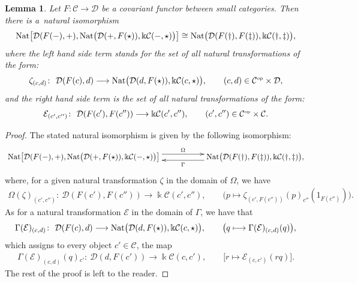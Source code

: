 \documentclass[pdftex]{sigma}
\numberwithin{equation}{section}
\newtheorem{Lemma}[Theorem]{Lemma}
\newcommand{\cD}{{\mathcal D}}
\newcommand{\cE}{{\mathcal E}}
\newcommand{\Sscript}[1]{\scriptscriptstyle{#1}}
\begin{document}
\begin{Lemma}\label{lema:I-II-2}Let $F\colon \mathcal{C} \to \cD$ be a covariant functor between small categories. Then there is a~natural isomorphism
\begin{gather*}
{\rm Nat}\big[ \cD(F(-),+), {\rm Nat} \big( \cD(+, F(\star)), \Bbbk \mathcal{C}(-,\star) \big) \big] \cong {\rm Nat}\big( \cD(F(\dag),F(\ddag)), \Bbbk \mathcal{C}(\dag,\ddag) \big),
\end{gather*}
where the left hand side term stands for the set of all natural transformations of the form:
\begin{gather*}
\zeta_{(c, d)}\colon \ \cD(F(c),d) \longrightarrow{\rm Nat} \big( \cD(d, F(\star)), \Bbbk \mathcal{C}(c,\star) \big), \qquad (c,d) \in \mathcal{C}^{\Sscript{\rm op}} \times \cD,
\end{gather*}
and the right hand side term is the set of all natural transformations of the form:
\begin{gather*}
\cE_{(c', c'')} \colon \ \cD(F(c'), F(c'')) \longrightarrow \Bbbk \mathcal{C}(c',c''), \qquad (c',c'') \in \mathcal{C}^{\Sscript{\rm op}} \times \mathcal{C}.
\end{gather*}
\end{Lemma}
\begin{proof}
The stated natural isomorphism is given by the following isomorphism:
\begin{gather*}
\xymatrix@R=0pt{ {\rm Nat}\big[ \cD(F(-),+), {\rm Nat} \big( \cD(+, F(\star)), \Bbbk \mathcal{C}(-,\star) \big) \big] \ar@<0.90ex>@{->}^-{\Omega}[rr] & & \ar@<0.90ex>@{->}^-{\Gamma}[ll] {\rm Nat}\big( \cD(F(\dag),F(\ddag)), \Bbbk \mathcal{C}(\dag,\ddag) \big),}
\end{gather*}
where, for a given natural transformation $\zeta$ in the domain of $\Omega$, we have
\begin{gather*}
\Omega(\zeta)_{(c',c'')} \colon \ \cD(F(c'),F(c'')) \longrightarrow \Bbbk \mathcal{C}(c',c''), \qquad \big( p \longmapsto \zeta_{(c', F(c''))}(p)_{c''}(1_{F(c'')}) \big).
\end{gather*}
As for a natural transformation $\cE$ in the domain of $\Gamma$, we have that
\begin{gather*}
\Gamma(\cE)_{(c, d)}\colon \ \cD(F(c),d) \longrightarrow {\rm Nat} \big( \cD(d, F(\star)), \Bbbk \mathcal{C}(c,\star) \big), \qquad \big( q \longmapsto \Gamma(\cE)_{(c, d)}(q) \big),
\end{gather*}
which assigns to every object $c' \in \mathcal{C}$, the map
\begin{gather*}
\Gamma(\cE)_{(c, d)}(q) { }_{c'}\colon \ \cD(d,F(c')) \longrightarrow \Bbbk \mathcal{C}(c,c'), \qquad \big[ r \mapsto \cE_{(c, c')}(rq) \big].
\end{gather*}
The rest of the proof is left to the reader.
\end{proof}
\end{document}
